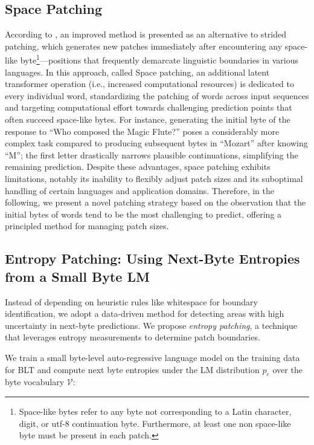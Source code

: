 \subsection{Space Patching}
\label{section:white-patch}

According to \citet{slagle2024spacebyte}, an improved method is presented as an alternative to strided patching, which generates new patches immediately after encountering any space-like byte\footnote{
    Space-like bytes refer to any byte not corresponding to a Latin character, digit, or utf-8 continuation byte. Furthermore, at least one non space-like byte must be present in each patch. }—positions that frequently demarcate linguistic boundaries in various languages. In this approach, called Space patching, an additional latent transformer operation (i.e., increased computational resources) is dedicated to every individual word, standardizing the patching of words across input sequences and targeting computational effort towards challenging prediction points that often succeed space-like bytes. For instance, generating the initial byte of the response to ``Who composed the Magic Flute?\uline{\hspace{.6em}}'' poses a considerably more complex task compared to producing subsequent bytes in ``Mozart'' after knowing ``M''; the first letter drastically narrows plausible continuations, simplifying the remaining prediction. Despite these advantages, space patching exhibits limitations, notably its inability to flexibly adjust patch sizes and its suboptimal handling of certain languages and application domains. Therefore, in the following, we present a novel patching strategy based on the observation that the initial bytes of words tend to be the most challenging to predict, offering a principled method for managing patch sizes.

\subsection{Entropy Patching: Using Next-Byte Entropies from a Small Byte LM}
\label{section:dyn-patch}

Instead of depending on heuristic rules like whitespace for boundary identification, we adopt a data-driven method for detecting areas with high uncertainty in next-byte predictions. We propose \textit{entropy patching}, a technique that leverages entropy measurements to determine patch boundaries.

We train a small byte-level auto-regressive language model on the training data for {\textsc BLT} and compute next byte entropies under the LM distribution $p_{e}$ over the byte vocabulary $\mathcal{V}$:

